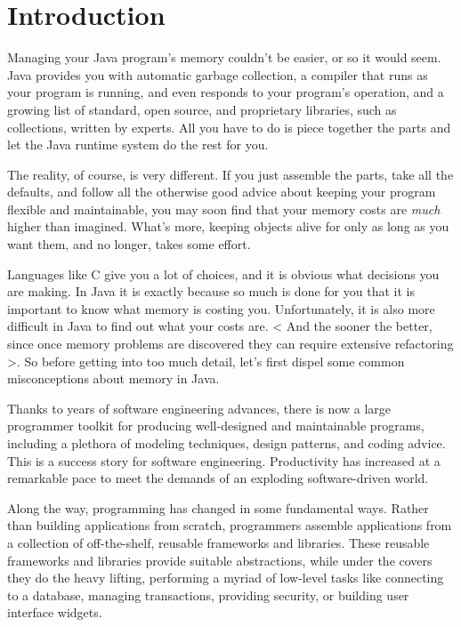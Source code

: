 
\chapter{Introduction}

Managing your Java program's memory couldn't be easier, or so it would
seem. Java provides you with automatic garbage collection, a compiler that
runs as your program is running, and even responds to your program's
operation, and a growing list of standard, open source, and proprietary libraries, such as collections,
written by experts. All you have to do is piece together the parts and let the Java runtime system do the rest for you.

The reality, of course, is very different. If you just assemble the parts, take
all the defaults, and follow all the otherwise good advice about keeping your
program flexible and maintainable, you may soon find that your memory costs are
\emph{much} higher than imagined.  What's more, keeping objects alive for only as long as you want them, and no longer, takes some effort. 

Languages like C give you a lot of choices, and it is obvious what
decisions you are making. In Java it is exactly because so much is done for you that it
is important to know what memory is costing you.  Unfortunately, it is also
more difficult in Java to find out what your costs are. < And the sooner the
better, since once memory problems are discovered they can require extensive
refactoring >.  So before getting into too much detail, let's first dispel some
common misconceptions about memory in Java.

Thanks to years of software engineering advances, there is now a large
programmer toolkit for producing well-designed and maintainable programs,
including a plethora of modeling techniques, design patterns, and coding 
advice. This is a success story for software engineering. Productivity has
increased at a remarkable pace to meet the demands of an exploding software-driven world. 

Along the way, programming has changed in some fundamental ways. Rather than building applications from scratch, programmers 
assemble applications from a collection of off-the-shelf, reusable frameworks
and libraries. These reusable frameworks and libraries provide suitable
abstractions, while under the covers they do the heavy lifting, performing a
myriad of low-level tasks like connecting to a database, managing transactions,
providing security, or building user interface widgets.

